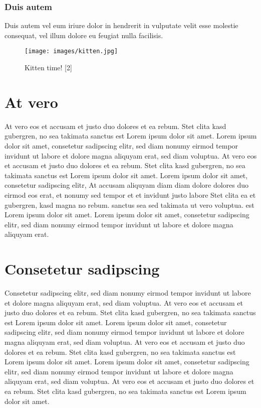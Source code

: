 \documentclass[12pt,twocolumn]{article}
\begin{document}
\subsubsection{Duis autem}\label{duis-autem-1}

Duis autem vel eum iriure dolor in hendrerit in vulputate velit esse
molestie consequat, vel illum dolore eu feugiat nulla facilisis.

\begin{figure}
\centering
\texttt{[image: images/kitten.jpg]}
\caption*{Kitten time! {[}2{]}}
\end{figure}

\section{At vero}\label{at-vero}

At vero eos et accusam et justo duo dolores et ea rebum. Stet clita kasd
gubergren, no sea takimata sanctus est Lorem ipsum dolor sit amet. Lorem
ipsum dolor sit amet, consetetur sadipscing elitr, sed diam nonumy
eirmod tempor invidunt ut labore et dolore magna aliquyam erat, sed diam
voluptua. At vero eos et accusam et justo duo dolores et ea rebum. Stet
clita kasd gubergren, no sea takimata sanctus est Lorem ipsum dolor sit
amet. Lorem ipsum dolor sit amet, consetetur sadipscing elitr, At
accusam aliquyam diam diam dolore dolores duo eirmod eos erat, et nonumy
sed tempor et et invidunt justo labore Stet clita ea et gubergren, kasd
magna no rebum. sanctus sea sed takimata ut vero voluptua. est Lorem
ipsum dolor sit amet. Lorem ipsum dolor sit amet, consetetur sadipscing
elitr, sed diam nonumy eirmod tempor invidunt ut labore et dolore magna
aliquyam erat.

\section{Consetetur sadipscing}\label{consetetur-sadipscing}

Consetetur sadipscing elitr, sed diam nonumy eirmod tempor invidunt ut
labore et dolore magna aliquyam erat, sed diam voluptua. At vero eos et
accusam et justo duo dolores et ea rebum. Stet clita kasd gubergren, no
sea takimata sanctus est Lorem ipsum dolor sit amet. Lorem ipsum dolor
sit amet, consetetur sadipscing elitr, sed diam nonumy eirmod tempor
invidunt ut labore et dolore magna aliquyam erat, sed diam voluptua. At
vero eos et accusam et justo duo dolores et ea rebum. Stet clita kasd
gubergren, no sea takimata sanctus est Lorem ipsum dolor sit amet. Lorem
ipsum dolor sit amet, consetetur sadipscing elitr, sed diam nonumy
eirmod tempor invidunt ut labore et dolore magna aliquyam erat, sed diam
voluptua. At vero eos et accusam et justo duo dolores et ea rebum. Stet
clita kasd gubergren, no sea takimata sanctus est Lorem ipsum dolor sit
amet.
\end{document}
